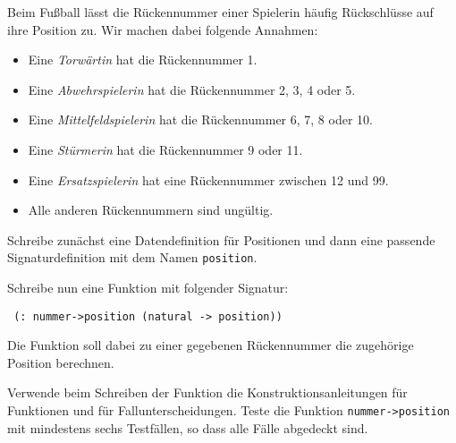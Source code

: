 \begin{aufgabe}
  Beim Fußball lässt die Rückennummer einer Spielerin
  häufig Rückschlüsse auf ihre Position zu. Wir machen dabei folgende
  Annahmen:
  \begin{itemize}
  \item Eine \emph{Torwärtin} hat die Rückennummer 1.
  \item Eine \emph{Abwehrspielerin} hat die Rückennummer 2, 3, 4 oder 5.
  \item Eine \emph{Mittelfeldspielerin} hat die Rückennummer 6, 7, 8 oder 10.
  \item Eine \emph{Stürmerin} hat die Rückennummer 9 oder 11.
  \item Eine \emph{Ersatzspielerin} hat eine Rückennummer zwischen 12 und 99.
  \item Alle anderen Rückennummern sind ungültig.
  \end{itemize}
  Schreibe zunächst eine Datendefinition für Positionen und dann eine
  passende Signaturdefinition mit dem Namen \lstinline{position}.
  
  Schreibe nun eine Funktion mit folgender Signatur:
\begin{lstlisting}
 (: nummer->position (natural -> position))
\end{lstlisting}
  Die Funktion soll dabei zu einer gegebenen Rückennummer die
  zugehörige Position berechnen.

  Verwende beim Schreiben der Funktion die
  Konstruktionsanleitungen für Funktionen und für
  Fallunterscheidungen.  Teste die Funktion
  \lstinline{nummer->position} mit mindestens sechs Testfällen, so dass
  alle Fälle abgedeckt sind.
\end{aufgabe}


